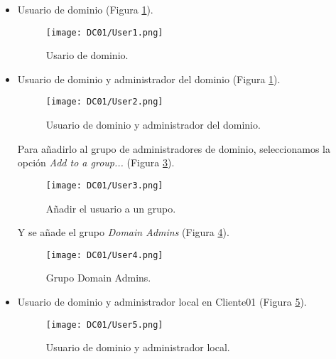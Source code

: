 \begin{itemize}

\item Usuario de dominio (Figura \ref{DC01-User1}). 
\begin{figure}[H] %
\begin{center}
\texttt{[image: DC01/User1.png]}
\end{center}
\caption{Usario de dominio.}
\label{DC01-User1}
\end{figure}


\item Usuario de dominio y administrador del dominio (Figura \ref{DC01-User1}). 
\begin{figure}[H] %
\begin{center}
\texttt{[image: DC01/User2.png]}
\end{center}
\caption{Usuario de dominio y administrador del dominio.}
\label{DC01-User2}
\end{figure}

Para añadirlo al grupo de administradores de dominio, seleccionamos la opción {\it Add to a group...} (Figura \ref{DC01-User3}).

\begin{figure}[H] %
\begin{center}
\texttt{[image: DC01/User3.png]}
\end{center}
\caption{Añadir el usuario a un grupo.}
\label{DC01-User3}
\end{figure}

Y se añade el grupo {\it Domain Admins} (Figura \ref{DC01-User4}).

\begin{figure}[H] %
\begin{center}
\texttt{[image: DC01/User4.png]}
\end{center}
\caption{Grupo Domain Admins.}
\label{DC01-User4}
\end{figure}

\item Usuario de dominio y administrador local en Cliente01 (Figura \ref{DC01-User5}).
\begin{figure}[H] %
\begin{center}
\texttt{[image: DC01/User5.png]}
\end{center}
\caption{Usuario de dominio y administrador local.}
\label{DC01-User5}
\end{figure}


\end{itemize}
